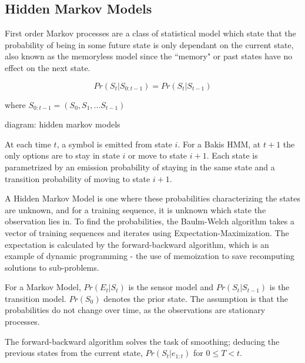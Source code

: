\documentclass[12pt,a4,notitlepage]{report}
\renewcommand{\_}{\texttt{\symbol{95}}}
\newcommand{\<}{\texttt{\symbol{60}}}
\renewcommand{\>}{\texttt{\symbol{62}}}
\begin{document}
\subsection{Hidden Markov Models}

First order Markov processes are a class of statistical model which state that the probability of being in some future state is only dependant on the current state, also known as the memoryless model since the ``memory" or past states have no effect on the next state.

\[ Pr(S_t|S_{0:t-1}) = Pr(S_t|S_{t-1}) \]

where $S_{0:t-1} = (S_0,S_1,...S_{t-1})$


{diagram: hidden markov models}

At each time $t$, a symbol is emitted from state $i$. For a Bakis HMM, at $t+1$ the only options are to stay in state $i$ or move to state $i+1$. Each state is parametrized by an emission probability of staying in the same state and a transition probability of moving to state $i+1$.

A Hidden Markov Model is one where these probabilities characterizing the states are unknown, and for a training sequence, it is unknown which state the observation lies in. To find the probabilities, the Baulm-Welch algorithm takes a vector of training sequences and iterates using Expectation-Maximization. The expectation is calculated by the forward-backward algorithm, which is an example of dynamic programming - the use of memoization to save recomputing solutions to sub-problems.

For a Markov Model, $Pr(E_t|S_t)$ is the sensor model and $Pr(S_t|S_{t-1})$ is the transition model. $Pr(S_0)$ denotes the prior state.\cite{AIModern} The assumption is that the probabilities do not change over time, as the observations are stationary processes.

The forward-backward algorithm solves the task of smoothing; deducing the previous states from the current state, $Pr(S_t|e_{1:t})$ for $0 \leq T < t$. 
\end{document}
